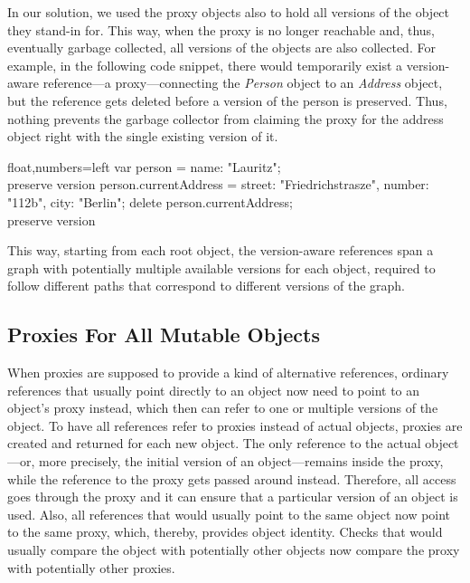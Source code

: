 In our solution, we used the proxy objects also to hold all versions of the object they stand-in for.
This way, when the proxy is no longer reachable and, thus, eventually garbage collected, all versions of the objects are also collected.
For example, in the following code snippet, there would temporarily exist a version-aware reference---a proxy---connecting the \emph{Person} object to an \emph{Address} object, but the reference gets deleted before a version of the person is preserved.
Thus, nothing prevents the garbage collector from claiming the proxy for the address object right with the single existing version of it.

\begin{code}{}{float,numbers=left}
    var person = {name: "Lauritz"};
    \\ preserve version
 person.currentAddress = {street: "Friedrichstrasze",
                         number: "112b",
                         city: "Berlin"};
    delete person.currentAddress;
    \\ preserve version
\end{code}
\iffalse
\end{verbatim}\fi
This way, starting from each root object, the version-aware references span a graph with potentially multiple available versions for each object, required to follow different paths that correspond to different versions of the graph.



\subsection{Proxies For All Mutable Objects}


When proxies are supposed to provide a kind of alternative references, ordinary references that usually point directly to an object now need to point to an object's proxy instead, which then can refer to one or multiple versions of the object.
To have all references refer to proxies instead of actual objects, proxies are created and returned for each new object.
The only reference to the actual object---or, more precisely, the initial version of an object---remains inside the proxy, while the reference to the proxy gets passed around instead.
Therefore, all access goes through the proxy and it can ensure that a particular version of an object is used.
Also, all references that would usually point to the same object now point to the same proxy, which, thereby, provides object identity.
Checks that would usually compare the object with potentially other objects now compare the proxy with potentially other proxies.

